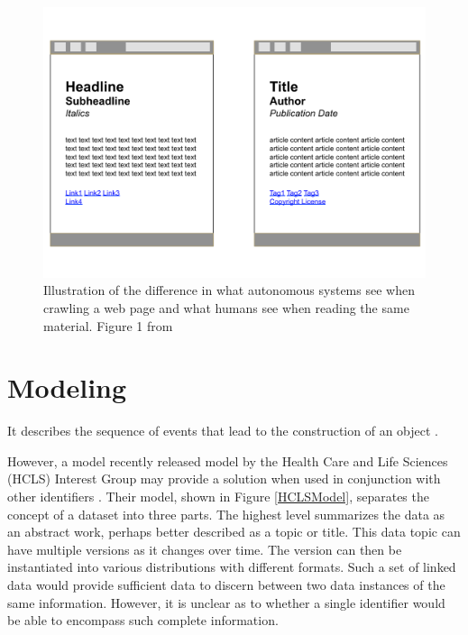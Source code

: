 \begin{figure}
	\centering
	\includegraphics[scale=0.40]{figures/RDFaSemantics.png}
	\caption{Illustration of the difference in what autonomous systems see when crawling a web page and what humans see when reading the same material. Figure 1 from \cite{Herman2015}}
	\label{RDFa}
\end{figure}

\section{Modeling}

It describes the sequence of events that lead to the construction of an object  \cite{dai2014provenance}.

However, a model recently released model by the Health Care and Life Sciences (HCLS) Interest Group may provide a solution when used in conjunction with other identifiers \cite{Dummontier2016}.
Their model, shown in Figure \ref{HCLSModel}, separates the concept of a dataset into three parts.
The highest level summarizes the data as an abstract work, perhaps better described as a topic or title.
This data topic can have multiple versions as it changes over time.
The version can then be instantiated into various distributions with different formats.
Such a set of linked data would provide sufficient data to discern between two data instances of the same information.
However, it is unclear as to whether a single identifier would be able to encompass such complete information.

